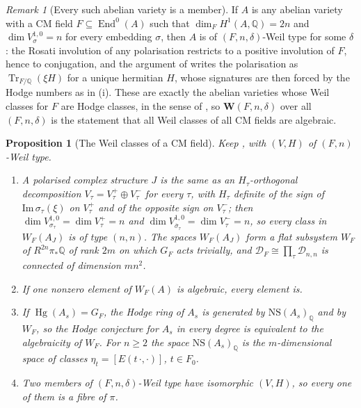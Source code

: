 \documentclass[11pt,reqno]{amsart}
\theoremstyle{plain}
\newtheorem{proposition}[theorem]{Proposition}
\theoremstyle{definition}
\theoremstyle{remark}
\newtheorem{remark}[theorem]{Remark}
\newcommand{\QQ}{\mathbb{Q}}
\newcommand{\cD}{\mathcal{D}}
\newcommand{\NS}{\mathrm{NS}}
\DeclareMathOperator{\End}{End}
\DeclareMathOperator{\Hg}{Hg}
\DeclareMathOperator{\Tr}{Tr}
\newcommand{\bbar}[1]{\overline{#1}}
\begin{document}
\begin{remark}[Every such abelian variety is a member]\label{rem:cmmember}
If $A$ is any abelian variety with a CM field $F\subseteq\End^{0}(A)$ such
that $\dim_{F}H^{1}(A,\QQ)=2n$ and $\dim V_{\sigma}^{1,0}=n$ for every
embedding $\sigma$, then $A$ is of $(F,n,\delta)$-Weil type for some
$\delta$: the Rosati involution of any polarisation restricts to a positive
involution of $F$, hence to conjugation, and the argument of
 writes the polarisation as $\Tr_{F/\QQ}(\xi H)$ for a
unique hermitian $H$, whose signatures are then forced by the Hodge numbers
as in (i). These are exactly the abelian varieties whose
Weil classes for $F$ are Hodge classes, in the sense of \cite{MZ99}, so
$\mathbf{W}(F,n,\delta)$ over all $(F,n,\delta)$ is the statement that all
Weil classes of all CM fields are algebraic.
\end{remark}

\begin{proposition}[The Weil classes of a CM field]\label{prop:cmweil}
Keep , with $(V,H)$ of $(F,n)$-Weil type.
\begin{enumerate}[label=\textup{(\roman*)},leftmargin=2.6em,itemsep=2pt]
\item A polarised complex structure $J$ is the same as an $H_{\tau}$-orthogonal
  decomposition $V_{\tau}=V_{\tau}^{+}\oplus V_{\tau}^{-}$ for every $\tau$,
  with $H_{\tau}$ definite of the sign of $\mathrm{Im}\,\sigma_{\tau}(\xi)$ on
  $V_{\tau}^{+}$ and of the opposite sign on $V_{\tau}^{-}$; then
  $\dim V^{1,0}_{\sigma_{\tau}}=\dim V_{\tau}^{+}=n$ and
  $\dim V^{1,0}_{\bbar\sigma_{\tau}}=\dim V_{\tau}^{-}=n$, so every class in
  $W_{F}(A_{J})$ is of type $(n,n)$. The spaces $W_{F}(A_{J})$ form a flat
  subsystem $W_{F}$ of $R^{2n}\pi_{*}\QQ$ of rank $2m$ on which $G_{F}$ acts
  trivially, and $\cD_{F}\cong\prod_{\tau}\cD_{n,n}$ is connected of
  dimension $mn^{2}$.
\item If one nonzero element of $W_{F}(A)$ is algebraic, every element is.
\item If $\Hg(A_{s})=G_{F}$, the Hodge ring of $A_{s}$ is generated by
  $\NS(A_{s})_{\QQ}$ and by $W_{F}$, so the Hodge conjecture for $A_{s}$ in
  every degree is equivalent to the algebraicity of $W_{F}$. For $n\ge2$ the
  space $\NS(A_{s})_{\QQ}$ is the $m$-dimensional space of classes
  $\eta_{t}=[E(t\,\cdot,\cdot)]$, $t\in F_{0}$.
\item Two members of $(F,n,\delta)$-Weil type have isomorphic $(V,H)$, so
  every one of them is a fibre of $\pi$.
\end{enumerate}
\end{proposition}
\end{document}

